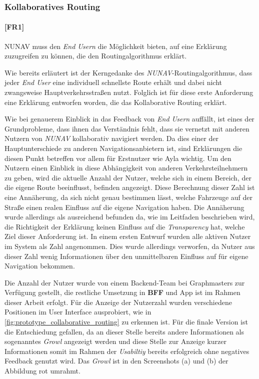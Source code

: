 \subsubsection{Kollaboratives Routing}
\label{sec:user_count_definition}

\paragraph{[FR1]} NUNAV muss den \textit{End Usern} die Möglichkeit bieten, auf eine Erklärung zuzugreifen zu können, die den Routingalgorithmus erklärt.

\bigskip

Wie bereits erläutert ist der Kerngedanke des \textit{NUNAV}-Routingalgorithmus, dass jeder \textit{End User} eine individuell schnellste Route erhält und dabei nicht zwangsweise Hauptverkehrsstraßen nutzt. Folglich ist für diese erste Anforderung eine Erklärung entworfen worden, die das Kollaborative Routing erklärt.

Wie bei genauerem Einblick in das Feedback von \textit{End Usern} auffällt, ist eines der Grundprobleme, dass ihnen das Verständnis fehlt, dass sie vernetzt mit anderen Nutzern von \textit{NUNAV} kollaborativ navigiert werden. Da dies einer der Hauptunterschiede zu anderen Navigationsanbietern ist, sind Erklärungen die diesen Punkt betreffen vor allem für Erstnutzer wie Ayla wichtig. Um den Nutzern einen Einblick in diese Abhängigkeit von anderen Verkehrsteilnehmern zu geben, wird die aktuelle Anzahl der Nutzer, welche sich in einem Bereich, der die eigene Route beeinflusst, befinden angezeigt. Diese Berechnung dieser Zahl ist eine Annäherung, da sich nicht genau bestimmen lässt, welche Fahrzeuge auf der Straße einen realen Einfluss auf die eigene Navigation haben. Die Annäherung wurde allerdings als ausreichend befunden da, wie im Leitfaden beschrieben wird, die Richtigkeit der Erklärung keinen Einfluss auf die \textit{Transparency} hat, welche Ziel dieser Anforderung ist. In einem ersten Entwurf wurden alle aktiven Nutzer im System als Zahl angenommen. Dies wurde allerdings verworfen, da Nutzer aus dieser Zahl wenig Informationen über den unmittelbaren Einfluss auf für eigene Navigation bekommen.

Die Anzahl der Nutzer wurde von einem Backend-Team bei Graphmasters zur Verfügung gestellt, die restliche Umsetzung in \textbf{BFF} und App ist im Rahmen dieser Arbeit erfolgt. Für die Anzeige der Nutzerzahl wurden verschiedene Positionen im User Interface ausprobiert, wie in \autoref{fig:prototype_collaborative_routing} zu erkennen ist. Für die finale Version ist die Entschiedung gefallen, da an dieser Stelle bereits andere Informationen als sogenanntes \textit{Growl} angezeigt werden und diese Stelle zur Anzeige kurzer Informationen somit im Rahmen der \textit{Usabiltiy} bereits erfolgreich ohne negatives Feedback genutzt wird. Das \textit{Growl} ist in den Screenshots (a) und (b) der Abbildung rot umrahmt.

